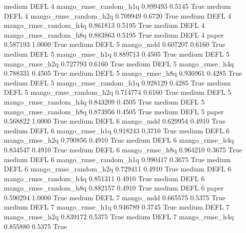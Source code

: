     medium     DEFL                 4 mango_rmse_random_h1q   0.899493      0.5145    True
    medium     DEFL                 4 mango_rmse_random_h2q   0.709949      0.6720    True
    medium     DEFL                 4 mango_rmse_random_h4q   0.861813      0.5195    True
    medium     DEFL                 4 mango_rmse_random_h8q   0.883863      0.5195    True
    medium     DEFL                 4                 paper   0.587193      1.0000    True
    medium     DEFL                 5             mango_mdd   0.607207      0.6160    True
    medium     DEFL                 5        mango_rmse_h1q   0.889713      0.4505    True
    medium     DEFL                 5        mango_rmse_h2q   0.727793      0.6160    True
    medium     DEFL                 5        mango_rmse_h4q   0.788331      0.4505    True
    medium     DEFL                 5        mango_rmse_h8q   0.936961      0.4285    True
    medium     DEFL                 5 mango_rmse_random_h1q   0.928129      0.4285    True
    medium     DEFL                 5 mango_rmse_random_h2q   0.714774      0.6160    True
    medium     DEFL                 5 mango_rmse_random_h4q   0.843209      0.4505    True
    medium     DEFL                 5 mango_rmse_random_h8q   0.873956      0.4505    True
    medium     DEFL                 5                 paper   0.568822      1.0000    True
    medium     DEFL                 6             mango_mdd   0.629954      0.4910    True
    medium     DEFL                 6        mango_rmse_h1q   0.918243      0.3710    True
    medium     DEFL                 6        mango_rmse_h2q   0.790856      0.4910    True
    medium     DEFL                 6        mango_rmse_h4q   0.834547      0.4910    True
    medium     DEFL                 6        mango_rmse_h8q   0.964210      0.3675    True
    medium     DEFL                 6 mango_rmse_random_h1q   0.990417      0.3675    True
    medium     DEFL                 6 mango_rmse_random_h2q   0.729411      0.4910    True
    medium     DEFL                 6 mango_rmse_random_h4q   0.851311      0.4910    True
    medium     DEFL                 6 mango_rmse_random_h8q   0.882157      0.4910    True
    medium     DEFL                 6                 paper   0.590294      1.0000    True
    medium     DEFL                 7             mango_mdd   0.665575      0.5375    True
    medium     DEFL                 7        mango_rmse_h1q   0.946789      0.3745    True
    medium     DEFL                 7        mango_rmse_h2q   0.839172      0.5375    True
    medium     DEFL                 7        mango_rmse_h4q   0.855880      0.5375    True
